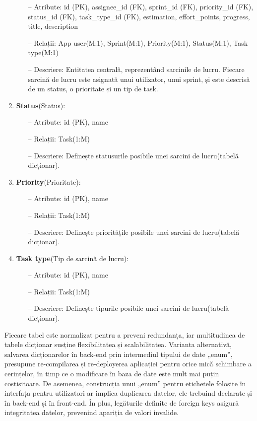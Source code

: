 \begin{enumerate}
\begin{itemize}
\item[--] Atribute: id (PK), assignee_id (FK), sprint_id (FK), priority_id (FK), status_id (FK), task_type_id (FK), estimation, effort_points, progress, title, description
\item[--] Relații: App user(M:1), Sprint(M:1), Priority(M:1), Status(M:1), Task type(M:1) 
\item[--] Descriere: Entitatea centrală, reprezentând sarcinile de lucru. Fiecare sarcină de lucru este asignată unui utilizator, unui sprint, și este descrisă de un status, o prioritate și un tip de task.
\end{itemize}
	\item \textbf{Status}(Status): 
\begin{itemize}
\item[--] Atribute: id (PK), name
\item[--] Relații: Task(1:M)
\item[--] Descriere: Definește statusurile posibile unei sarcini de lucru(tabelă dicționar).
\end{itemize}
	\item \textbf{Priority}(Prioritate): 
\begin{itemize}
\item[--] Atribute: id (PK), name
\item[--] Relații: Task(1:M)
\item[--] Descriere: Definește prioritățile posibile unei sarcini de lucru(tabelă dicționar).
\end{itemize}
	\item \textbf{Task type}(Tip de sarcină de lucru): 
\begin{itemize}
\item[--] Atribute: id (PK), name
\item[--] Relații: Task(1:M)
\item[--] Descriere: Definește tipurile posibile unei sarcini de lucru(tabelă dicționar).
\end{itemize}
\end{enumerate}

Fiecare tabel este normalizat pentru a preveni redundanța, iar multitudinea de tabele dicționar susține flexibilitatea și scalabilitatea. Varianta alternativă, salvarea dicționarelor în back-end prin intermediul tipului de date „enum”, presupune re-compilarea și re-deployerea aplicației pentru orice mică schimbare a cerințelor, în timp ce o modificare în baza de date este mult mai puțin costisitoare. De asemenea, construcția unui „enum” pentru etichetele folosite în interfața pentru utilizatori ar implica duplicarea datelor, ele trebuind declarate și în back-end și în front-end. În plus, legăturile definite de foreign keys asigură integritatea datelor, prevenind apariția de valori invalide.

